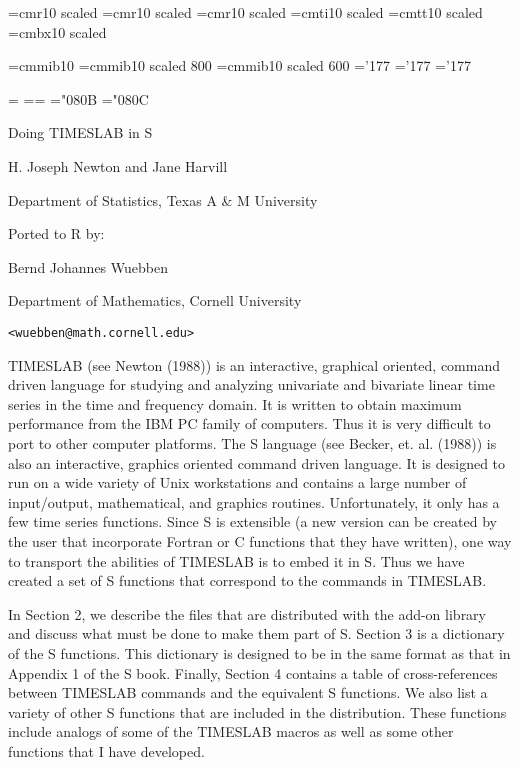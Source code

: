 \baselineskip=14pt
\font\ffour=cmr10 scaled
\font\ftwo=cmr10 scaled
\font\fhalf=cmr10 scaled\magstephalf
\font\ithalf=cmti10 scaled\magstephalf
\font\ttone=cmtt10 scaled\magstephalf
\font\bftwo=cmbx10 scaled
\def\tsl#1{{\tt#1}}

%
\font\tenmibf=cmmib10
\font\eightmibf=cmmib10 scaled 800
\font\sixmibf=cmmib10 scaled 600
\newfam\mibffam
\skewchar\tenmibf='177
\skewchar\eightmibf='177
\skewchar\sixmibf='177
\def\tenptbf{
\def\bf{\fam\bffam\tenmibf} \textfont\mibffam=\tenmibf
\scriptfont\mibffam=\eightmibf \scriptscriptfont\mibffam=\sixmibf}
\tenptbf
\mathchardef\Valpha="080B
\mathchardef\Vbeta="080C
%
%

\def\sechd#1{\vskip 4mm\noindent{\bftwo#1}\vskip 4mm}
{\ffour 
\centerline{Doing TIMESLAB in S}
}
{\ftwo
\vskip 6mm\centerline{H. Joseph Newton and Jane Harvill}\vskip 2mm
\centerline{Department of Statistics, Texas A \& M University}\vskip 4mm
\centerline{Ported to R by:}\vskip 2mm
\centerline{Bernd Johannes Wuebben} \vskip 2mm
\centerline{Department of Mathematics, Cornell University}
\centerline{\tt <wuebben@math.cornell.edu> \rm}
}
\vskip 10mm
\fhalf
\sechd{1. Introduction}
TIMESLAB (see Newton (1988)) is an interactive, graphical oriented, command
driven language for studying and analyzing univariate and bivariate linear
time series in the time and frequency domain. It is written to obtain
maximum performance from the IBM PC family of computers. Thus it is very
difficult to port to other computer platforms. The S language (see
Becker, et. al. (1988)) is also an interactive, graphics oriented command
driven language.
It is designed to run on a wide variety of Unix workstations and 
contains a large number of
input/output, mathematical, and graphics routines. Unfortunately, it
only has a few time series functions. Since S is
extensible (a new version can be created by the user that incorporate
Fortran or C functions that they have written), one way to transport the
{\ithalf abilities} of TIMESLAB is to embed it in S. Thus we have created
a set of S functions that correspond to the commands in TIMESLAB.

In Section 2, we describe the files that are distributed with the add-on
library and discuss what must be done to make them part of S.
Section 3 is a dictionary of the S functions.
This dictionary is designed to be in the same format as that in 
Appendix 1 of the S book. Finally, Section 4 contains a table of 
cross-references between TIMESLAB commands and the equivalent S functions.
We also list a variety of other S functions that are included in the
distribution. These functions include analogs of some of the TIMESLAB 
macros as well as some other functions that I have developed.

